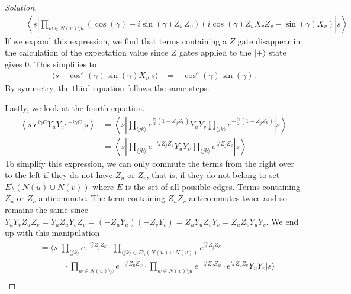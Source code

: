 \documentclass[11pt]{article}
\newenvironment{question}[2][Question]{\begin{trivlist}
\item[\hskip \labelsep {\bfseries #1}\hskip \labelsep {\bfseries #2.}]}{\end{trivlist}}
\newenvironment{solution}{\begin{proof}[Solution]}{\end{proof}}
\newcommand{\lr}[3]{\!\left#1 #3 \right#2}
\begin{document}
\begin{question}{2}
\begin{enumerate}[(a)]
\begin{solution}
\begin{align*}
                    &= \lr\langle\rangle{s\lr||{\prod_{w\in N(v)\setminus u}\lr(){\cos\lr(){\gamma}-i\sin\lr(){\gamma}Z_wZ_v}\lr(){i\cos(\gamma)Z_uX_vZ_v-\sin(\gamma)X_v}}s}
                \end{align*}
                If we expand this expression, we find that terms containing a $Z$ gate disappear in the calculation of the expectation value since $Z$ gates applied to the $|+\rangle$ state gives 0. This simplifies to
                \begin{align*}
                    \langle s|-\cos^e(\gamma)\sin(\gamma)X_v|s\rangle &= -\cos^e(\gamma)\sin(\gamma).
                \end{align*}
                By symmetry, the third equation follows the same steps.

                Lastly, we look at the fourth equation. 
                \begin{align*}
                    \left\langle s\left|e^{i \gamma C} Y_u Y_v e^{-i \gamma C}\right| s\right\rangle &=  \left\langle s\left|\prod_{\langle jk\rangle} e^{\frac{i\gamma}{2}(1-Z_jZ_k)}Y_uY_v \prod_{\langle jk\rangle} e^{-\frac{i\gamma}{2}(1-Z_jZ_k)}\right|s\right\rangle \\
                    &= \left\langle s\left|\prod_{\langle jk\rangle} e^{-\frac{i\gamma}{2}Z_jZ_k}Y_uY_v \prod_{\langle jk\rangle} e^{\frac{i\gamma}{2}Z_jZ_k}\right|s\right\rangle 
                \end{align*}
                To simplify this expression, we can only commute the terms from the right over to the left if they do not have $Z_u$ or $Z_v$, that is, if they do not belong to set $E\setminus (N(u)\cup N(v))$ where $E$ is the set of all possible edges. Terms containing $Z_u$ or $Z_v$ anticommute. The term containing $Z_uZ_v$ anticommutes twice and so remains the same since $Y_uY_vZ_uZ_v = Y_uZ_uY_vZ_v=(-Z_uY_u)(-Z_vY_v)=Z_uY_uZ_vY_v=Z_uZ_vY_uY_v$. We end up with this manipulation
                \begin{align*}
                    &= \Bigg\langle s\Bigg|\prod_{\langle jk\rangle} e^{-\frac{i\gamma}{2}Z_jZ_k}
                    \cdot \prod_{\langle jk\rangle \in E\setminus(N(u)\cup N(v))} e^{\frac{i\gamma}{2}Z_jZ_k} \\
                    & \quad\quad\quad\cdot \prod_{w\in N(u)\setminus v}e^{-\frac{i\gamma}{2}Z_uZ_w}
                    \cdot \prod_{w\in N(v)\setminus u}e^{-\frac{i\gamma}{2}Z_vZ_w}
                    \cdot e^{\frac{i\gamma}{2}Z_uZ_v}Y_uY_v \Bigg|s\Bigg\rangle  \\

\end{align*}
\end{solution}
\end{enumerate}
\end{question}
\end{document}
